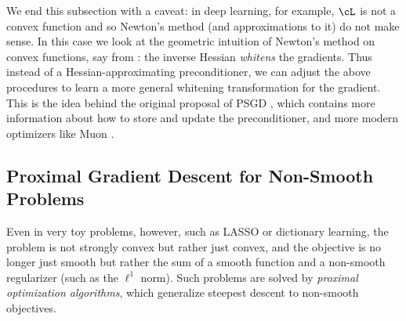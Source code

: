 \documentclass[../../book-main.tex]{subfiles}
\begin{document}
We end this subsection with a caveat: in deep learning, for example,
\(\cL\) is not a convex function and so Newton's method (and
approximations to it) do not make sense. In this case we look at the
geometric intuition of Newton's method on convex functions, say from
: the inverse Hessian \textit{whitens} the
gradients. Thus instead of a Hessian-approximating preconditioner, we
can adjust the above procedures to learn a more general whitening
transformation for the gradient. This is the idea behind the original
proposal of PSGD \cite{li2017preconditioned}, which contains more
information about how to store and update the preconditioner, and
more modern optimizers like Muon \cite{liu2025muon}.

\subsection{Proximal Gradient Descent for Non-Smooth Problems}\label{subsec:pgd}

Even in very toy problems, however, such as LASSO or dictionary
learning, the problem is not strongly convex but rather just convex,
and the objective is no longer just smooth but rather the sum of a
smooth function and a non-smooth regularizer (such as the
\(\ell^{1}\) norm). Such problems are solved by \textit{proximal
optimization algorithms}, which generalize steepest descent to
non-smooth objectives.
\end{document}
